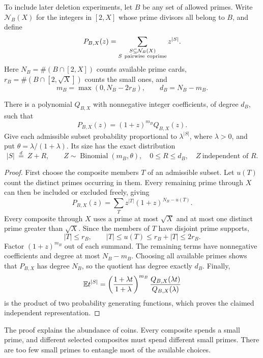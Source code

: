 To include later deletion experiments, let $B$ be any set of allowed
primes.  Write $\mathcal N_B(X)$ for the integers in $[2,X]$ whose
prime divisors all belong to $B$, and define
\[
 P_{B,X}(z)=\sum_{\substack{S\subseteq\mathcal N_B(X)\\
                       S\ {\rm pairwise\ coprime}}}z^{|S|}.
\]
Here $N_B=\#(B\cap[2,X])$ counts available prime cards,
$r_B=\#(B\cap[2,\sqrt X])$ counts the small ones, and
\[
 m_B=\max(0,N_B-2r_B),\qquad d_B=N_B-m_B.
\]
\begin{theorem}\label{fin:binomial}
There is a polynomial $Q_{B,X}$ with nonnegative integer coefficients,
of degree $d_B$, such that
\[
 \boxed{P_{B,X}(z)=(1+z)^{m_B}Q_{B,X}(z).}
\]
Give each admissible subset probability proportional to
$\lambda^{|S|}$, where $\lambda>0$, and put
$\theta=\lambda/(1+\lambda)$.  Its size has the exact distribution
\begin{equation}
 |S|\ \overset d=\ Z+R,\qquad
 Z\sim\operatorname{Binomial}(m_B,\theta),\quad
 0\le R\le d_B,\quad Z\ \text{independent of }R.
 \label{fin:coinrepresentation}
\end{equation}
\end{theorem}
\begin{proof}
First choose the composite members $T$ of an admissible subset.
Let $u(T)$ count the distinct primes occurring in them.  Every remaining
prime through $X$ can then be included or excluded freely, giving
\begin{equation}
 P_{B,X}(z)=\sum_T z^{|T|}(1+z)^{N_B-u(T)}.                 \label{fin:splitpoly}
\end{equation}
Every composite through $X$ uses a prime at most $\sqrt X$ and at most
one distinct prime greater than $\sqrt X$.  Since the members of $T$
have disjoint prime supports,
\[
 |T|\le r_B,\qquad |T|\le u(T)\le r_B+|T|\le2r_B.
\]
Factor $(1+z)^{m_B}$ out of each summand.  The remaining terms have
nonnegative coefficients and degree at most $N_B-m_B$.
Choosing all available primes shows that $P_{B,X}$ has degree $N_B$,
so the quotient has degree exactly $d_B$.
Finally,
\[
 \mathbb E t^{|S|}
 =\left(\frac{1+\lambda t}{1+\lambda}\right)^{m_B}
   \frac{Q_{B,X}(\lambda t)}{Q_{B,X}(\lambda)}
\]
is the product of two probability generating functions, which proves
the claimed independent representation.
\end{proof}

The proof explains the abundance of coins.  Every composite spends a
small prime, and different selected composites must spend different
small primes.  There are too few small primes to entangle most of the
available choices.

